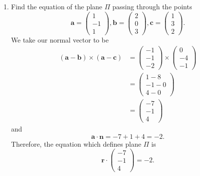 \begin{example}
\begin{enumerate}
        \item Find the equation of the plane $\Pi$ passing through the points
        \[
            \bm a=
            \begin{pmatrix}
                1\\-1\\1
            \end{pmatrix}
            ,\bm b=
            \begin{pmatrix}
                2\\0\\3
            \end{pmatrix}
            ,\bm c=
            \begin{pmatrix}
                1\\3\\2
            \end{pmatrix}
            .
        \]
        We take our normal vector to be
        \begin{align*}
            (\bm a-\bm b)\times(\bm a-\bm c)&=
            \begin{pmatrix}
                -1\\-1\\-2
            \end{pmatrix}
            \times
            \begin{pmatrix}
                0\\-4\\-1
            \end{pmatrix}
            \\
            &=
            \begin{pmatrix}
                1-8\\-1-0\\4-0
            \end{pmatrix}
            \\
            &=
            \begin{pmatrix}
                -7\\-1\\4
            \end{pmatrix}
        \end{align*}
        and
        \[\bm a\cdot\bm n=-7+1+4=-2.\]
        Therefore, the equation which defines plane $\Pi$ is
        \[
            \bm r\cdot
            \begin{pmatrix}
                -7\\-1\\4
            \end{pmatrix}
            =-2.
        \]
    \end{enumerate}
\end{example}

